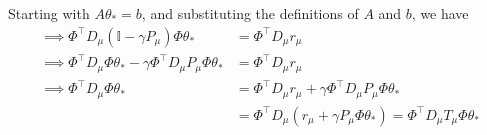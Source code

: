 Starting with \( A \theta_{*} = b \), and substituting the definitions of \( A \) and \( b \), we have
\begin{align*}
    \implies
    \Phi^{\top} D_{\mu}\left(\mathbb{I}-\gamma P_{\mu}\right) \Phi \theta_{*}
     & =
    \Phi^{\top} D_{\mu} r_{\mu}
    \\
    \implies
    \Phi^{\top} D_{\mu} \Phi \theta_{*} - \gamma \Phi^{\top} D_{\mu} P_{\mu} \Phi \theta_{*}
     & =
    \Phi^{\top} D_{\mu} r_{\mu}
    \\
    \implies
    \Phi^{\top} D_{\mu} \Phi \theta_{*}
     & =
    \Phi^{\top} D_{\mu} r_{\mu} + \gamma \Phi^{\top} D_{\mu} P_{\mu} \Phi \theta_{*}
    \\ & =
    \Phi^{\top} D_{\mu} \left( r_{\mu} + \gamma P_{\mu} \Phi \theta_{*} \right)
    =
    \Phi^{\top} D_{\mu} T_{\mu} \Phi \theta_{*}
\end{align*}
